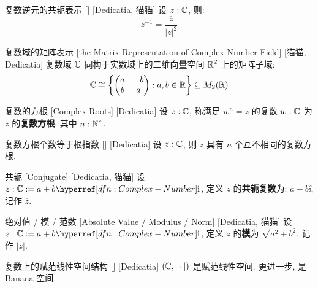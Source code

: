         \begin{ppt}
            {复数逆元的共轭表示}
            []
            [Dedicatia, 猫猫]
            设 \(z:\operatorname{\mathbb{C}}\), 则: 
            \[z^{-1}=\frac{\overline{z}}{|z|^2}\]
        \end{ppt}
        
        \begin{thm}
            {复数域的矩阵表示}
            [the Matrix Representation of Complex Number Field]
            [猫猫, Dedicatia]
            复数域 \(\operatorname{\mathbb{C}}\) 同构于实数域上的二维向量空间 \(\operatorname{\mathbb{R}}^2\) 上的矩阵子域:
            \[\operatorname{\mathbb{C}}\cong\left\{\begin{pmatrix}
                a & -b\\
                b & a
            \end{pmatrix}:a,b\in\operatorname{\mathbb{R}}\right\}\subseteq M_2(\operatorname{\mathbb{R}})\]
        \end{thm}
        
        \begin{dfn}
            {复数的方根}
            [Complex Roots]
            [Dedicatia]
            设 \(z:\operatorname{\mathbb{C}}\), 称满足 \(w^n=z\) 的复数 \(w:\operatorname{\mathbb{C}}\) 为 \(z\) 的\textbf{复数方根}. 其中 \(n:\operatorname{\mathbb{N}}^*\).
        \end{dfn}
        
        \begin{ppt}
            {复数方根个数等于根指数}
            []
            [Dedicatia]
            设 \(z:\operatorname{\mathbb{C}}\), 则 \(z\) 具有 \(n\) 个互不相同的复数方根.
        \end{ppt}
        
        \begin{dfn}
            {共轭}
            [Conjugate]
            [Dedicatia, 猫猫]
            设 \(z:\C:=a+b\ii\), 定义 \(z\) 的\textbf{共轭复数}为: \(a-b\ii\), 记作 \(\overline{z}\). 
        \end{dfn}
        
        \begin{dfn}
            {绝对值 / 模 / 范数}
            [Absolute Value / Modulus / Norm]
            [Dedicatia, 猫猫]
            设 \(z:\C:=a+b\ii\), 定义 \(z\) 的\textbf{模}为 \(\sqrt{a^2+b^2}\), 记作 \(|z|\). 
        \end{dfn}
        
        \begin{ppt}
            {复数上的赋范线性空间结构}
            []
            [Dedicatia]
            \((\operatorname{\mathbb{C}}, |\cdot|)\) 是赋范线性空间. 更进一步, 是 Banana 空间. 
        \end{ppt}
        
